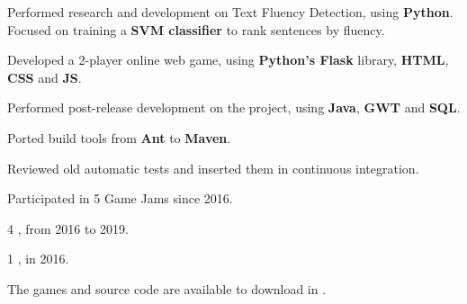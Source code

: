 \documentclass[a4paper]{deedy-resume} %
\begin{document}
\begin{minipage}[t]{0.64\textwidth}
\sectionspace %


\begin{tightitemize}
    \item Performed research and development on Text Fluency Detection, using \textbf{Python}. Focused on training a \textbf{SVM classifier} to rank sentences by fluency.
    \item Developed a 2-player online web game, using \textbf{Python’s Flask} library, \textbf{HTML}, \textbf{CSS} and \textbf{JS}.
\end{tightitemize}

\sectionspace %



\begin{tightitemize}
    \item Performed post-release development on the \textbf{} project, using \textbf{Java}, \textbf{GWT} and \textbf{SQL}.
    \item Ported build tools from \textbf{Ant} to \textbf{Maven}.
    \item Reviewed old automatic tests and inserted them in continuous integration.
\end{tightitemize}

\sectionspace %




\begin{tightitemize}
    \item Participated in 5 Game Jams since 2016.
    \item 4 , from 2016 to 2019.
    \item 1 , in 2016.
    \item The games and source code are available to download in \href{https://nunoxu.github.io/#portfolio}{}.
\end{tightitemize}


\end{minipage}
\end{document}
